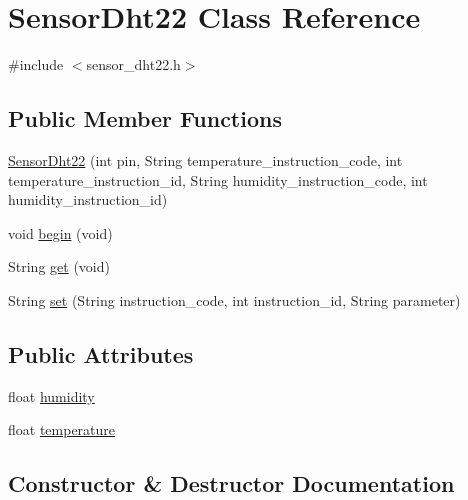 \hypertarget{class_sensor_dht22}{}\section{Sensor\+Dht22 Class Reference}
\label{class_sensor_dht22}


{\ttfamily \#include $<$sensor\+\_\+dht22.\+h$>$}

\subsection*{Public Member Functions}
\begin{DoxyCompactItemize}
\item 
\hyperlink{class_sensor_dht22_a417840f2a31737059e6b0885d89de32f}{Sensor\+Dht22} (int pin, String temperature\+\_\+instruction\+\_\+code, int temperature\+\_\+instruction\+\_\+id, String humidity\+\_\+instruction\+\_\+code, int humidity\+\_\+instruction\+\_\+id)
\item 
void \hyperlink{class_sensor_dht22_ae4de2976d82d060c9dc12bf84195a347}{begin} (void)
\item 
String \hyperlink{class_sensor_dht22_ad939eefeb967eea7029d9505cc6aad6f}{get} (void)
\item 
String \hyperlink{class_sensor_dht22_a177a42edbc33d5cf4fa0c4c38dc0047c}{set} (String instruction\+\_\+code, int instruction\+\_\+id, String parameter)
\end{DoxyCompactItemize}
\subsection*{Public Attributes}
\begin{DoxyCompactItemize}
\item 
float \hyperlink{class_sensor_dht22_a93f9363f3086e00f440fc89a7f1f8a1b}{humidity}
\item 
float \hyperlink{class_sensor_dht22_af35665067c66e887afa5fef5611fb48a}{temperature}
\end{DoxyCompactItemize}


\subsection{Constructor \& Destructor Documentation}
\hypertarget{class_sensor_dht22_a417840f2a31737059e6b0885d89de32f}{}

